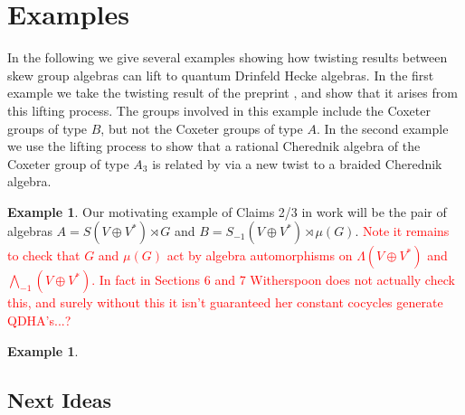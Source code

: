 \documentclass[10pt]{article}
\theoremstyle{definition}
\newtheorem{example}[lemma]{Example}
\begin{document}

\section{Examples}\label{examples_sec}
In the following we give several examples showing how twisting results between skew group algebras can lift to quantum Drinfeld Hecke algebras. In the first example we take the twisting result of the preprint \cite{}, and show that it arises from this lifting process. The groups involved in this example include the Coxeter groups of type $B$, but not the Coxeter groups of type $A$. In the second example we use the lifting process to show that a rational Cherednik algebra of the Coxeter group of type $A_3$ is related by via a new twist to a braided Cherednik algebra.
\begin{example} Our motivating example of Claims 2/3 in work will be the pair of algebras $A=S(V\oplus V^*)\rtimes G$ and $B=S_{-1}(V\oplus V^*)\rtimes \mu(G)$. \textcolor{red}{Note it remains to check that $G$ and $\mu(G)$ act by algebra automorphisms on $\Lambda(V\oplus V^*)$ and $\bigwedge_{-1}(V\oplus V^*)$. In fact in \cite{2011arXiv11115243N} Sections 6 and 7 Witherspoon does not actually check this, and surely without this it isn't guaranteed her constant cocycles generate QDHA's...?}
\end{example}

\begin{example}
  
\end{example}





\iffalse
\subsection*{Next Ideas}
\end{document}
